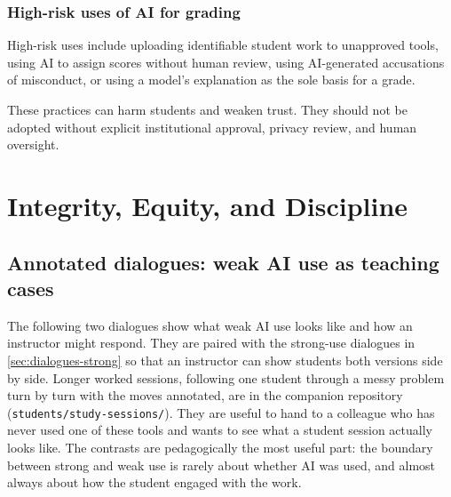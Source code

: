\documentclass{SIAMbook2023}
\begin{document}
\subsection{High-risk uses of AI for grading}
\label{i:subsec:risky-grading}

High-risk uses include uploading identifiable student work to unapproved tools, using AI to assign scores without human review, using AI-generated accusations of misconduct, or using a model's explanation as the sole basis for a grade.

These practices can harm students and weaken trust. They should not be adopted without explicit institutional approval, privacy review, and human oversight.

\chapter{Integrity, Equity, and Discipline}
\label{i:ch:integrity-equity-and-discipline}%

\section{Annotated dialogues: weak AI use as teaching cases}
\label{i:sec:dialogues-weak}

The following two dialogues show what weak AI use looks like and how an instructor might respond. They are paired with the strong-use dialogues in \cref{sec:dialogues-strong} so that an instructor can show students both versions side by side. Longer worked sessions, following one student through a messy problem turn by turn with the moves annotated, are in the companion repository (\texttt{students/study-sessions/}). They are useful to hand to a colleague who has never used one of these tools and wants to see what a student session actually looks like. The contrasts are pedagogically the most useful part: the boundary between strong and weak use is rarely about whether AI was used, and almost always about how the student engaged with the work.
\end{document}
